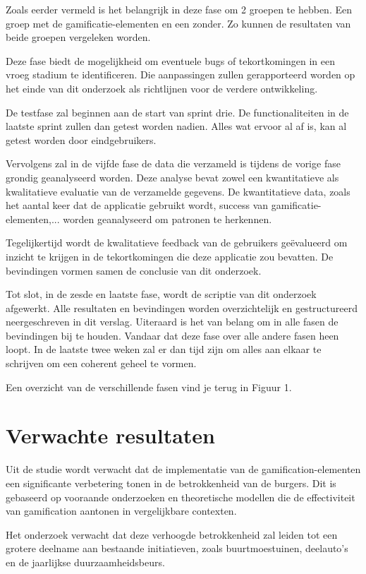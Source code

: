 \documentclass{hogent-article}
\begin{document}
Zoals eerder vermeld is het belangrijk in deze fase om 2 groepen te hebben. Een groep met de gamificatie-elementen en een zonder. Zo kunnen de resultaten van beide groepen vergeleken worden. 

Deze fase biedt de mogelijkheid om eventuele bugs of tekortkomingen in een vroeg stadium te identificeren. Die aanpassingen zullen gerapporteerd worden op het einde van dit onderzoek als richtlijnen voor de verdere ontwikkeling.

De testfase zal beginnen aan de start van sprint drie. De functionaliteiten in de laatste sprint zullen dan getest worden nadien. Alles wat ervoor al af is, kan al getest worden door eindgebruikers.

Vervolgens zal in de vijfde fase de data die verzameld is tijdens de vorige fase grondig geanalyseerd worden. Deze analyse bevat zowel een kwantitatieve als kwalitatieve evaluatie van de verzamelde gegevens. De kwantitatieve data, zoals het aantal keer dat de applicatie gebruikt wordt, success van gamificatie-elementen,... worden geanalyseerd om patronen te herkennen. 

Tegelijkertijd wordt de kwalitatieve feedback van de gebruikers geëvalueerd om inzicht te krijgen in de tekortkomingen die deze applicatie zou bevatten. De bevindingen vormen samen de conclusie van dit onderzoek.

Tot slot, in de zesde en laatste fase, wordt de scriptie van dit onderzoek afgewerkt. Alle resultaten en bevindingen worden overzichtelijk en gestructureerd neergeschreven in dit verslag. Uiteraard is het van belang om in alle fasen de bevindingen bij te houden. Vandaar dat deze fase over alle andere fasen heen loopt. In de laatste twee weken zal er dan tijd zijn om alles aan elkaar te schrijven om een coherent geheel te vormen.

Een overzicht van de verschillende fasen vind je terug in Figuur 1.

\section{Verwachte resultaten}%
\label{sec:verwachte-resultaten}
Uit de studie wordt verwacht dat de implementatie van de gamification-elementen een significante verbetering tonen in de betrokkenheid van de burgers. Dit is gebaseerd op vooraande onderzoeken en theoretische modellen die de effectiviteit van gamification aantonen in vergelijkbare contexten.

Het onderzoek verwacht dat deze verhoogde betrokkenheid zal leiden tot een grotere deelname aan bestaande initiatieven, zoals buurtmoestuinen, deelauto's en de jaarlijkse duurzaamheidsbeurs.
\end{document}
